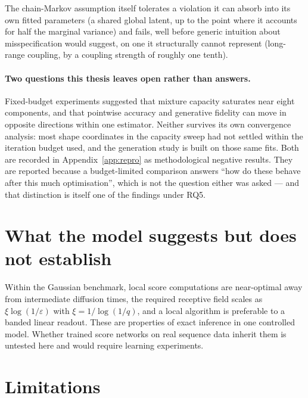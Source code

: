 The chain-Markov assumption itself tolerates a violation it can absorb into
its own fitted parameters (a shared global latent, up to the point where it
accounts for half the marginal variance) and fails, well before generic
intuition about misspecification would suggest, on one it structurally cannot
represent (long-range coupling, by a coupling strength of roughly one tenth).

\paragraph{Two questions this thesis leaves open rather than answers.}
Fixed-budget experiments suggested that mixture capacity saturates near eight
components, and that pointwise accuracy and generative fidelity can move in
opposite directions within one estimator. Neither survives its own convergence
analysis: most shape coordinates in the capacity sweep had not settled within
the iteration budget used, and the generation study is built on those same
fits. Both are recorded in Appendix~\ref{app:repro} as methodological negative
results. They are reported because a budget-limited comparison answers ``how do
these behave after this much optimisation'', which is not the question either
was asked --- and that distinction is itself one of the findings under RQ5.

\section{What the model suggests but does not establish}

Within the Gaussian benchmark, local score computations are near-optimal
away from intermediate diffusion times, the required receptive field
scales as $\xi \log(1/\varepsilon)$ with $\xi = 1/\log(1/q)$, and a
local algorithm is preferable to a banded linear readout. These are
properties of exact inference in one controlled model. Whether trained
score networks on real sequence data inherit them is untested here and
would require learning experiments.

\section{Limitations}

